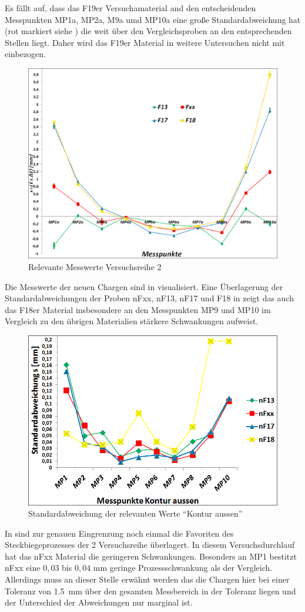 \documentclass[12pt,a4paper,parskip]{scrartcl}
\begin{document}
Es fällt auf, dass das F19er Versuchamaterial and den entscheidenden Messpunkten MP1a, MP2a, M9a umd MP10a eine große Standardabweichung hat (rot markiert siehe ) die weit über den Vergleichsproben an den entsprechenden Stellen liegt. Daher wird das F19er Material in weitere Untersuchen nicht mit einbezogen.
\begin{figure}[hbtp]
\centering
\includegraphics[width=.8\textwidth]{messwerte2}
\caption{Relevante Messwerte Versuchsreihe 2}
\label{fig:messw2}
\end{figure}
Die Messwerte der neuen Chargen sind in  visualisiert. Eine Überlagerung der Standardabweichungen der Proben nFxx, nF13, nF17 und F18  in  zeigt das auch das F18er Material insbesondere an den Messpunkten MP9 und MP10 im Vergleich zu den übrigen Materialien stärkere Schwankungen aufweist.
\begin{figure}[hbtp]
\centering
\includegraphics[width=.8\textwidth]{standardxx131718}
\caption{Standardabweichung der relevanten Werte "`Kontur aussen"'}
\label{fig:standard123}
\end{figure}
In  sind zur genauen Eingrenzung noch einmal die Favoriten des Steckbiegeprozesses der 2 Versuchsreihe überlagert. In diesem Versuchsdurchlauf hat das nFxx Material die geringeren Schwankungen. Besonders an MP1 bestitzt nFxx  eine $ 0,03 $ bis $ 0,04 $  mm geringe Prozessschwankung  als der Vergleich. Allerdings muss an dieser Stelle erwähnt werden das die Chargen hier bei einer Toleranz von \SI{1,5}{mm} über den gesamten Messbereich in der Toleranz liegen und der Unterschied  der  Abweichungen nur marginal ist. 
\end{document}
